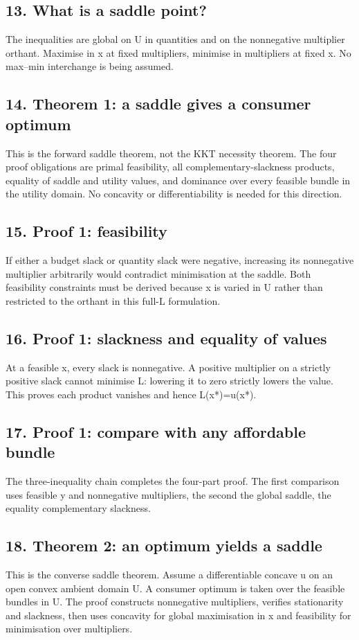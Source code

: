 \documentclass[11pt,a4paper]{article}
\begin{document}
\subsection*{13. What is a saddle point?}
The inequalities are global on U in quantities and on the nonnegative multiplier orthant. Maximise in x at fixed multipliers, minimise in multipliers at fixed x. No max--min interchange is being assumed.

\subsection*{14. Theorem 1: a saddle gives a consumer optimum}
This is the forward saddle theorem, not the KKT necessity theorem. The four proof obligations are primal feasibility, all complementary-slackness products, equality of saddle and utility values, and dominance over every feasible bundle in the utility domain. No concavity or differentiability is needed for this direction.

\subsection*{15. Proof 1: feasibility}
If either a budget slack or quantity slack were negative, increasing its nonnegative multiplier arbitrarily would contradict minimisation at the saddle. Both feasibility constraints must be derived because x is varied in U rather than restricted to the orthant in this full-L formulation.

\subsection*{16. Proof 1: slackness and equality of values}
At a feasible x, every slack is nonnegative. A positive multiplier on a strictly positive slack cannot minimise L: lowering it to zero strictly lowers the value. This proves each product vanishes and hence L(x*)=u(x*).

\subsection*{17. Proof 1: compare with any affordable bundle}
The three-inequality chain completes the four-part proof. The first comparison uses feasible y and nonnegative multipliers, the second the global saddle, the equality complementary slackness.

\subsection*{18. Theorem 2: an optimum yields a saddle}
This is the converse saddle theorem. Assume a differentiable concave u on an open convex ambient domain U. A consumer optimum is taken over the feasible bundles in U. The proof constructs nonnegative multipliers, verifies stationarity and slackness, then uses concavity for global maximisation in x and feasibility for minimisation over multipliers.
\end{document}
